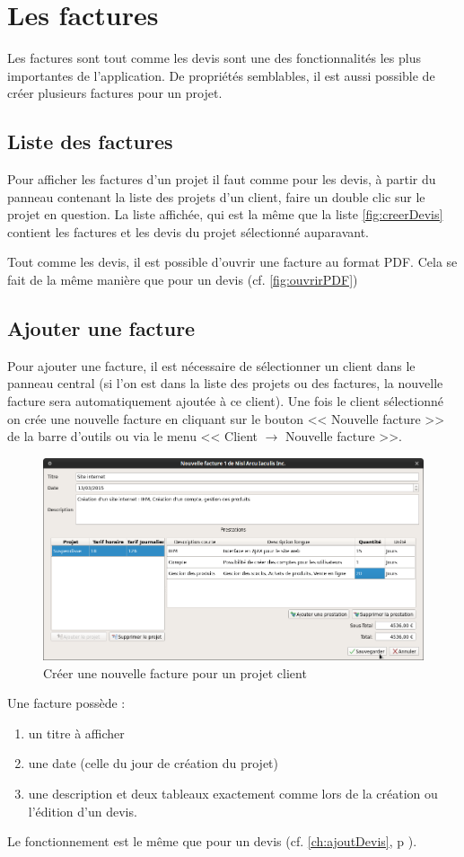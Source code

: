 \chapter{Les factures}
Les factures sont tout comme les devis sont une des fonctionnalités les plus importantes de l'application. De propriétés semblables, il est aussi possible de créer plusieurs factures pour un projet.
\section{Liste des factures}
Pour afficher les factures d'un projet il faut comme pour les devis, à partir du panneau contenant la liste des projets d'un client, faire un double clic sur le projet en question. La liste affichée, qui est la même que la liste \ref{fig:creerDevis} contient les factures et les devis du projet sélectionné auparavant.

Tout comme les devis, il est possible d'ouvrir une facture au format PDF. Cela se fait de la même manière que pour un devis (cf. \ref{fig:ouvrirPDF})
\section{Ajouter une facture}
Pour ajouter une facture, il est nécessaire de sélectionner un client dans le panneau central (si l'on est dans la liste des projets ou des factures, la nouvelle facture sera automatiquement ajoutée à ce client). Une fois le client sélectionné on crée une nouvelle facture en cliquant sur le bouton << Nouvelle facture >> de la barre d'outils ou via le menu << Client $\rightarrow$ Nouvelle facture >>. 
\begin{figure}[H]
	\centering
	\includegraphics[width=17cm]{screens/creerFacture.png}
	\caption{Créer une nouvelle facture pour un projet client}
	\label{fig:creerFacture}
\end{figure}
Une facture possède :
\begin{enumerate}
	\item un titre à afficher
	\item une date (celle du jour de création du projet)
	\item une description et deux tableaux exactement comme lors de la création ou l'édition d'un devis.
\end{enumerate}	
 Le fonctionnement est le même que pour un devis (cf. \ref*{ch:ajoutDevis}, p \pageref{ch:Prestations}).

